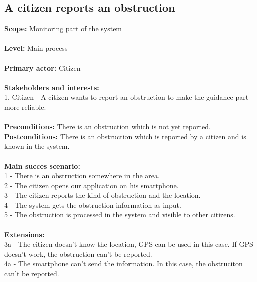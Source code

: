 \subsection{A citizen reports an obstruction}
\textbf{Scope:} Monitoring part of the system\\\\
\textbf{Level:} Main process\\\\
\textbf{Primary actor:} Citizen\\\\
\textbf{Stakeholders and interests:}\\
	1. Citizen - A citizen wants to report an obstruction to make the guidance part more reliable. \\\\
\textbf{Preconditions:} There is an obstruction which is not yet reported. \\
\textbf{Postconditions:} There is an obstruction which is reported by a citizen and is known in the system. \\\\
\textbf{Main succes scenario:} \\
1 - There is an obstruction somewhere in the area. \\
2 - The citizen opens our application on his smartphone. \\
3 - The citizen reports the kind of obstruction and the location. \\
4 - The system gets the obstruction information as input. \\
5 - The obstruction is processed in the system and visible to other citizens. \\\\
\textbf{Extensions:} \\
3a - The citizen doesn't know the location, GPS can be used in this case. If GPS doesn't work, the obstruction can't be reported. \\
4a - The smartphone can't send the information. In this case, the obstruciton can't be reported. 
